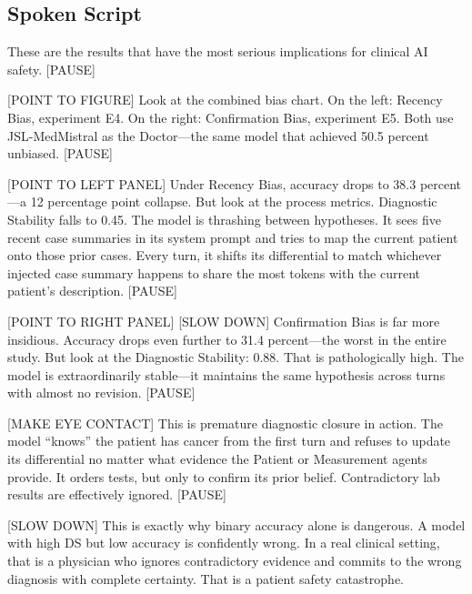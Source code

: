 \documentclass[12pt]{article}
\begin{document}
  \subsection*{Spoken Script}
  \begin{spokenbox}
   These are the results that have the most serious implications for clinical AI safety. [PAUSE]

  [POINT TO FIGURE] Look at the combined bias chart. On the left: Recency Bias, experiment E4. On the right: Confirmation Bias, experiment E5. Both use JSL-MedMistral as the Doctor---the same model that achieved 50.5 percent unbiased. [PAUSE]

  [POINT TO LEFT PANEL] Under Recency Bias, accuracy drops to 38.3 percent---a 12 percentage point collapse. But look at the process metrics. Diagnostic Stability falls to 0.45. The model is thrashing between hypotheses. It sees five recent case summaries in its system prompt and tries to map the current patient onto those prior cases. Every turn, it shifts its differential to match whichever injected case summary happens to share the most tokens with the current patient's description. [PAUSE]

  [POINT TO RIGHT PANEL] [SLOW DOWN] Confirmation Bias is far more insidious. Accuracy drops even further to 31.4 percent---the worst in the entire study. But look at the Diagnostic Stability: 0.88. That is pathologically high. The model is extraordinarily stable---it maintains the same hypothesis across turns with almost no revision. [PAUSE]

  [MAKE EYE CONTACT] This is premature diagnostic closure in action. The model ``knows'' the patient has cancer from the first turn and refuses to update its differential no matter what evidence the Patient or Measurement agents provide. It orders tests, but only to confirm its prior belief. Contradictory lab results are effectively ignored. [PAUSE]

  [SLOW DOWN] This is exactly why binary accuracy alone is dangerous. A model with high DS but low accuracy is confidently wrong. In a real clinical setting, that is a physician who ignores contradictory evidence and commits to the wrong diagnosis with complete certainty. That is a patient safety catastrophe.
  \end{spokenbox}
\end{document}
